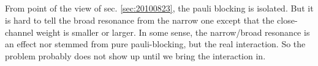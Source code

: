 \subsection{}
From point of the view of sec. \ref{sec:20100823}, the pauli blocking is isolated.  But it is hard to tell the broad resonance from the narrow one except that the close-channel weight is smaller or larger.  In some sense, the narrow/broad resonance is an effect nor stemmed from pure pauli-blocking, but the real interaction. So the problem probably does not show up until we bring the interaction in.   